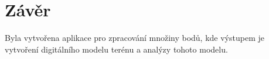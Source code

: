 \documentclass[oneside,12pt,a4paper]{book}
\begin{document}
\chapter{Závěr} 
Byla vytvořena aplikace pro zpracování množiny bodů, kde výstupem je vytvoření digitálního modelu terénu a analýzy tohoto modelu.

\begingroup
    \pageclear
    \printbibliography[title=Literatura]
\endgroup

\end{document}
